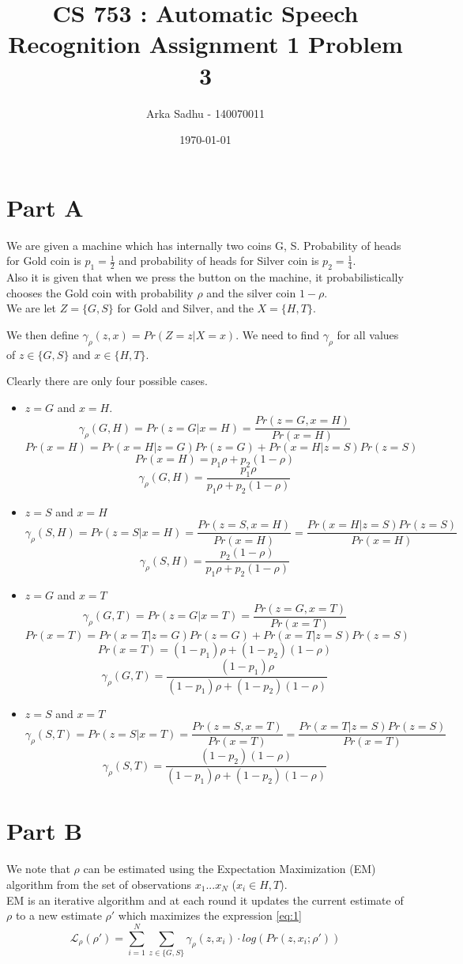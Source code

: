 \documentclass{article}
\title{CS 753 : Automatic Speech Recognition Assignment 1 Problem 3}
\author{Arka Sadhu - 140070011}
\date{\today}
\newcommand{\gamp}{\gamma_{\rho}}
\newcommand{\Lp}{\mathcal{L_\rho(\rho')}}
\begin{document}
\maketitle
\section{Part A}
We are given a machine which has internally two coins G, S. Probability of heads for Gold coin is $p_1 = \frac{1}{2}$ and probability of heads for Silver coin is $p_2 = \frac{1}{4}$. \\

Also it is given that when we press the button on the machine, it probabilistically chooses the Gold coin with probability $\rho$ and the silver coin $1 - \rho$.\\

We are let $Z = \{G, S\}$ for Gold and Silver, and the $X = \{H, T\}$.

We then define $\gamp(z, x) = Pr(Z = z | X = x)$. We need to find $\gamp$ for all values of $z \in \{G,S\}$ and $x \in \{H, T\}$.

Clearly there are only four possible cases.
\begin{itemize}
\item $z = G$ and $x = H$.
  $$\gamp(G, H) = Pr(z = G|x =H) = \frac{Pr(z = G,x = H)}{Pr(x =H)}$$
  $$Pr(x = H) = Pr(x = H|z = G)Pr(z = G) + Pr(x = H|z = S)Pr(z = S)$$
  $$Pr(x = H) = p_1 \rho + p_2 (1 - \rho)$$
  $$\gamp(G, H) = \frac{p_1 \rho}{p_1 \rho + p_2 (1 - \rho)}$$
\item $z = S$ and $x = H$
  $$\gamp(S, H) = Pr(z = S|x =H) = \frac{Pr(z = S,x = H)}{Pr(x =H)} = \frac{Pr(x = H| z = S)Pr(z = S)}{Pr(x = H)}$$
  $$\gamp(S, H) = \frac{p_2 (1 -\rho)}{p_1 \rho + p_2 (1 - \rho)}$$
\item $z = G$ and $x = T$
  $$\gamp(G, T) = Pr(z = G|x =T) = \frac{Pr(z = G,x = T)}{Pr(x =T)}$$
  $$Pr(x = T) = Pr(x = T|z = G)Pr(z = G) + Pr(x = T|z = S)Pr(z = S)$$
  $$Pr(x = T) = (1 - p_1) \rho + (1 - p_2)(1 - \rho)$$
  $$\gamp(G, T) = \frac{(1 - p_1) \rho}{(1 - p_1) \rho + (1 - p_2)(1 - \rho)}$$
\item $z = S$ and $x = T$
  $$\gamp(S, T) = Pr(z = S|x =T) = \frac{Pr(z = S,x = T)}{Pr(x =T)} = \frac{Pr(x = T| z = S)Pr(z = S)}{Pr(x = T)}$$
  $$\gamp(S, T) = \frac{(1 - p_2)(1 - \rho)}{(1 - p_1) \rho + (1 - p_2)(1 - \rho)}$$
\end{itemize}

\section{Part B}
We note that $\rho$ can be estimated using the Expectation Maximization (EM) algorithm from the set of observations $x_1...x_N$ ($x_i \in {H,T}$).\\
EM is an iterative algorithm and at each round it updates the current estimate of $\rho$ to a new estimate $\rho'$ which maximizes the expression \ref{eq:1}
\begin{equation}
  \label{eq:1}
  \Lp = \sum_{i = 1}^{N} \sum_{z \in \{G,S\}}\gamp(z,x_i)\cdot log(Pr(z, x_i; \rho'))
\end{equation}
\end{document}

